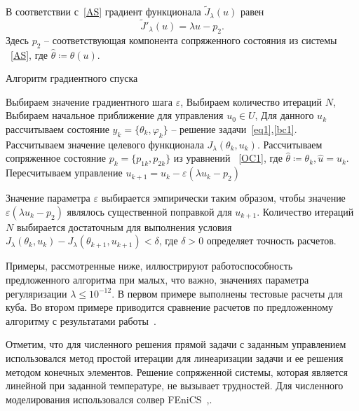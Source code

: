 \documentclass[12pt]{article}
\begin{document}
    В соответствии с~\eqref{AS} градиент функционала $\tilde J_\lambda(u)$ равен
    \[ \tilde J'_\lambda (u) = \lambda u - p_2. \]
    Здесь $p_2$ -- соответствующая компонента сопряженного состояния из системы ~\eqref{AS},
    где $\hat{\theta}\coloneqq\theta(u)$.

    \begin{algorithm}[H]
        \caption{Алгоритм градиентного спуска}
        \label{alg:algorithm}
        \begin{algorithmic}[1]
            \State Выбираем значение градиентного шага $\varepsilon$,
            \State Выбираем количество итераций $N$,
            \State Выбираем начальное приближение для управления $u_0 \in U$,
                \State Для данного $u_k$ рассчитываем состояние $y_k = \{\theta_k, \varphi_k\}$ --
                решение задачи~\eqref{eq1},\eqref{bc1}.
                \State Рассчитываем значение целевого функционала $J_\lambda(\theta_k, u_k)$.
                \State Рассчитываем сопряженное состояние $p_k=\{p_{1k},p_{2k}\}$ из уравнений ~\eqref{OC1},
                где $ \hat{\theta} \coloneqq \theta_k, \hat{u}=u_k$.
                \State Пересчитываем управление $u_{k+1} = u_k - \varepsilon (\lambda u_k - p_2)$
            \EndFor
        \end{algorithmic}
    \end{algorithm}
    Значение параметра $\varepsilon$ выбирается эмпирически таким образом, чтобы значение
    $\varepsilon (\lambda u_k - p_2)$ являлось существенной поправкой для $u_{k+1}$.
    Количество итераций $N$ выбирается достаточным для выполнения условия
    $J_\lambda(\theta_k, u_k) - J_\lambda(\theta_{k+1}, u_{k+1}) < \delta$, где $\delta>0$
    определяет точность расчетов.

    Примеры, рассмотренные ниже, иллюстрируют работоспособность предложенного алгоритма при
    малых, что важно, значениях параметра регуляризации $\lambda \leq 10^{-12}$.
    В первом примере выполнены тестовые расчеты для куба.
    Во втором примере приводится сравнение расчетов по
    предложенному алгоритму с результатами работы~\cite{CNSNS19}.

    Отметим, что для численного решения прямой задачи с заданным управлением использовался
    метод простой итерации для линеаризации задачи и ее решения методом конечных элементов.
    Решение сопряженной системы, которая является линейной при заданной температуре, не вызывает трудностей.
    Для численного моделирования использовался солвер FEniCS~\cite{fenics},\cite{dolfin}.
\end{document}
